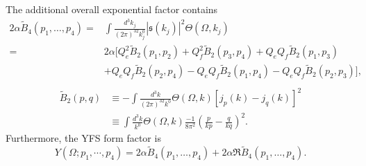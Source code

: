 The additional overall exponential factor contains
\begin{align}
2\alpha\widetilde{B}_4(p_1,\ldots,p_4)=&\int\frac{d^3k_j}{(2\pi)^32k^0_j}|\mathfrak{s}(k_j)|^2\Theta(\Omega,k_j)\nonumber\\
=&2\alpha[Q_e^2\widetilde{B}_2(p_1,p_2)+Q_f^2\widetilde{B}_2(p_3,p_4)+Q_eQ_f\widetilde{B}_2(p_1,p_3)\nonumber\\
&+Q_eQ_f\widetilde{B}_2(p_2,p_4)-Q_eQ_f\widetilde{B}_2(p_1,p_4)-Q_eQ_f\widetilde{B}_2(p_2,p_3)],\nonumber\\
\end{align}
\begin{align}
\widetilde{B}_2(p,q)&\equiv-\int\frac{d^3k}{(2\pi)^32k^0}\Theta(\Omega,k)[j_p(k)-j_q(k)]^2\nonumber\\
&\equiv\int\frac{d^3k}{k^0}\Theta(\Omega,k)\frac{-1}{8\pi^2}\left( \frac{p}{kp}-\frac{q}{kq} \right)^2.
\end{align}
Furthermore, the YFS form factor is 
\begin{equation}
Y(\Omega;p_1,\cdots,p_4)=2\alpha\widetilde{B}_4(p_1,\ldots,p_4)+2\alpha\Re\widetilde{B}_4(p_1,\ldots,p_4).
\end{equation}

